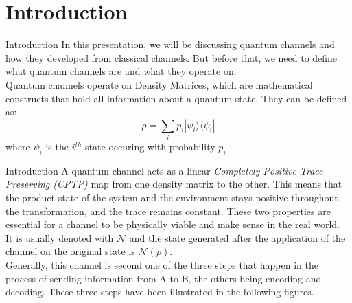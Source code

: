 \section{Introduction}

\begin{frame}{Introduction}
    In this presentation, we will be discussing quantum channels and how they developed from classical channels. But before that, we need to define what quantum channels
    are and what they operate on. \\
    Quantum channels operate on Density Matrices, which are mathematical constructs that hold all information about a quantum state. They can be defined as:
    \begin{equation}
        \rho = \sum_{i}p_i | \psi_i \rangle \langle \psi_i |   
    \end{equation}
    where $\psi_i$ is the $i^{th}$ state occuring with probability $p_i$
\end{frame}

\begin{frame}{Introduction}
    A quantum channel acts as a linear \textit{Completely Positive Trace Preserving (CPTP)} map from one density matrix to the other. This means that the product state
    of the system and the environment stays positive throughout the transformation, and the trace remains constant. These two properties are essential for a channel to
    be physically viable and make sense in the real world.\\
    It is usually denoted with $\mathcal{N}$ and the state generated after the application of the channel on the original state is $\mathcal{N} (\rho)$.\\
    Generally, this channel is second one of the three steps that happen in the process of sending information from A to B, the others being encoding and decoding.
    These three steps have been illustrated in the following figures.
\end{frame}

